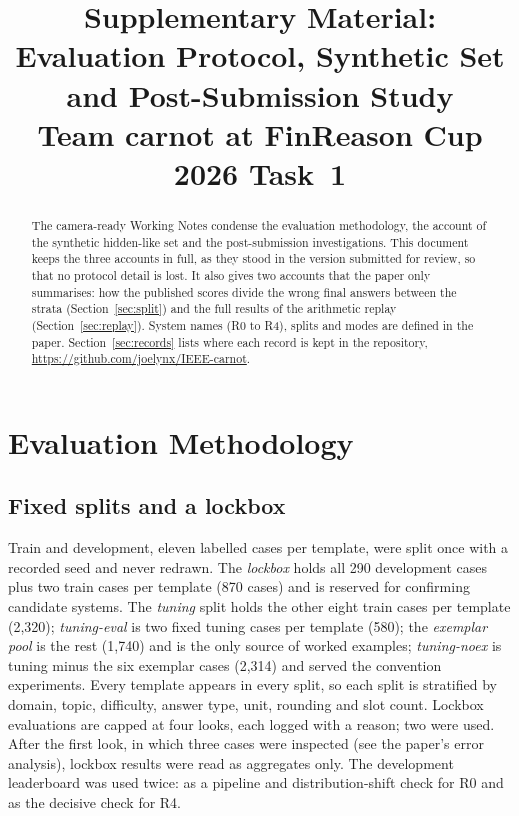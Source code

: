 \documentclass[conference]{IEEEtran}
\begin{document}
\title{Supplementary Material: Evaluation Protocol, Synthetic Set and Post-Submission Study\\ Team carnot at FinReason Cup 2026 Task~1}

\author{
}

\maketitle

\begin{abstract}
The camera-ready Working Notes condense the evaluation methodology, the account of the synthetic hidden-like set and the post-submission investigations. This document keeps the three accounts in full, as they stood in the version submitted for review, so that no protocol detail is lost. It also gives two accounts that the paper only summarises: how the published scores divide the wrong final answers between the strata (Section~\ref{sec:split}) and the full results of the arithmetic replay (Section~\ref{sec:replay}). System names (R0 to R4), splits and modes are defined in the paper. Section~\ref{sec:records} lists where each record is kept in the repository, \url{https://github.com/joelynx/IEEE-carnot}.
\end{abstract}

\section{Evaluation Methodology}\label{sec:method}

\subsection{Fixed splits and a lockbox}
Train and development, eleven labelled cases per template, were split once with a recorded seed and never redrawn. The \emph{lockbox} holds all 290 development cases plus two train cases per template (870 cases) and is reserved for confirming candidate systems. The \emph{tuning} split holds the other eight train cases per template (2,320); \emph{tuning-eval} is two fixed tuning cases per template (580); the \emph{exemplar pool} is the rest (1,740) and is the only source of worked examples; \emph{tuning-noex} is tuning minus the six exemplar cases (2,314) and served the convention experiments. Every template appears in every split, so each split is stratified by domain, topic, difficulty, answer type, unit, rounding and slot count. Lockbox evaluations are capped at four looks, each logged with a reason; two were used. After the first look, in which three cases were inspected (see the paper's error analysis), lockbox results were read as aggregates only. The development leaderboard was used twice: as a pipeline and distribution-shift check for R0 and as the decisive check for R4.
\end{document}
